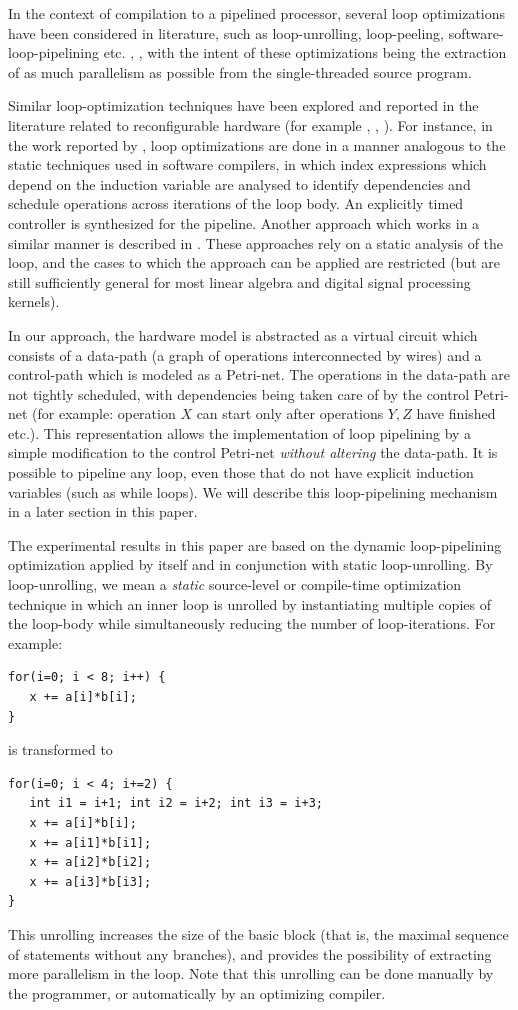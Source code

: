 \documentclass[conference]{IEEEtran}
\begin{document}
In the context of compilation to a pipelined processor, 
several loop optimizations
have been considered in literature, such as loop-unrolling, loop-peeling,
software-loop-pipelining etc. \cite{wolfe}, \cite{muchnick}, with the intent of
these optimizations being the extraction of as much
parallelism as possible from the single-threaded source program. 

Similar loop-optimization techniques have been explored and
reported in the literature related to reconfigurable hardware (for
example \cite{Weinhardt}, \cite{Cardoso}, \cite{Kastner}).  For instance,
in the work reported by \cite{Weinhardt},
loop optimizations are done in a manner analogous to the static
techniques used in software compilers, in which index 
expressions which depend on the induction variable
are analysed to identify dependencies and schedule operations
across iterations of the loop body.  An explicitly timed controller is synthesized
for the pipeline.  Another approach which works in a similar
manner is described in \cite{Cardoso}.  These approaches rely on a static analysis of
the loop, and the cases to which the approach can be applied
are restricted (but are still sufficiently general for most linear
algebra and digital signal processing kernels).

In our approach, the hardware model is abstracted as
a virtual circuit which consists of a data-path (a graph of operations 
interconnected by wires) and a control-path
which is modeled as a Petri-net.   The operations in the data-path are
not tightly scheduled, with dependencies being taken care of
by the control Petri-net (for example: operation $X$ can start only
after operations $Y,Z$ have finished etc.). This representation allows the implementation
of loop pipelining by a simple modification to the control Petri-net
{\em without altering} the data-path.  It is possible to pipeline any loop, 
even those that do not have explicit induction variables (such as while loops).  
We will describe this loop-pipelining mechanism in a later section in
this paper.

The experimental results in this paper are based on the dynamic loop-pipelining
optimization applied by itself and in conjunction with static loop-unrolling.
By loop-unrolling, we mean a {\em static} source-level or compile-time optimization technique in
which  an inner loop is unrolled by instantiating multiple copies of the loop-body
while simultaneously reducing the number of loop-iterations.  For example:
\begin{verbatim}
for(i=0; i < 8; i++) {
   x += a[i]*b[i];
}
\end{verbatim}
is transformed to
\begin{verbatim}
for(i=0; i < 4; i+=2) {
   int i1 = i+1; int i2 = i+2; int i3 = i+3;
   x += a[i]*b[i];
   x += a[i1]*b[i1];
   x += a[i2]*b[i2];
   x += a[i3]*b[i3];
}
\end{verbatim}
This unrolling increases the size of the basic block (that is, the maximal sequence of
statements without any branches), and provides the possibility of extracting more
parallelism in the loop.  Note that this unrolling can be done manually
by the programmer, or automatically by an optimizing compiler.
\end{document}
